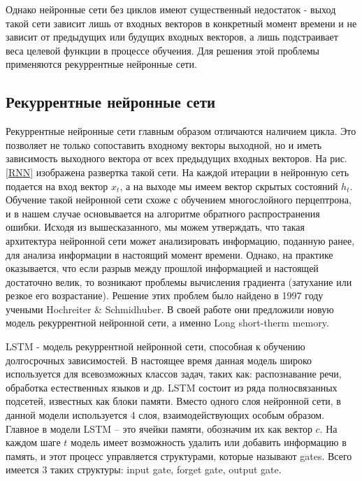     Однако нейронные сети без циклов имеют существенный недостаток - выход такой сети зависит лишь от входных векторов в конкретный момент времени и не зависит от предыдущих или будущих входных векторов, а лишь подстраивает веса целевой функции в процессе обучения. Для решения этой проблемы применяются рекуррентные нейронные сети.

    \subsection{Рекуррентные нейронные сети}
    Рекуррентные нейронные сети главным образом отличаются наличием цикла. Это позволяет не только сопоставить входному векторы выходной, но и иметь зависимость выходного вектора от всех предыдущих входных векторов. На рис. \ref{RNN} изображена развертка такой сети. На каждой итерации в нейронную сеть подается на вход вектор $x_{t}$, а на выходе мы имеем вектор скрытых состояний $h_{t}$.
    Обучение такой нейронной сети схоже с обучением многослойного перцептрона, и в нашем случае основывается на алгоритме обратного распространения ошибки. Исходя из вышесказанного, мы можем утверждать, что такая архитектура нейронной сети может анализировать информацию, поданную ранее, для анализа информации в настоящий момент времени. Однако, на практике оказывается, что если разрыв между прошлой информацией и настоящей достаточно велик, то возникают проблемы вычисления градиента (затухание или резкое его возрастание). Решение этих проблем было найдено в 1997 году учеными Hochreiter \& Schmidhuber. В своей работе они предложили новую модель рекуррентной нейронной сети, а именно Long short-therm memory.

    LSTM - модель рекуррентной нейронной сети, способная к обучению долгосрочных зависимостей. В настоящее время данная модель широко используется для всевозможных классов задач, таких как: распознавание речи, обработка естественных языков и др. LSTM состоит из ряда полносвязанных подсетей, известных как блоки памяти. Вместо одного слоя нейронной сети, в данной модели используется 4 слоя, взаимодействующих особым образом. Главное в модели LSTM – это ячейки памяти, обозначим их как вектор $c$. На каждом шаге $t$ модель имеет возможность удалить или добавить информацию в память, и этот процесс управляется структурами, которые называют gates. Всего имеется 3 таких структуры: input gate, forget gate, output gate.

